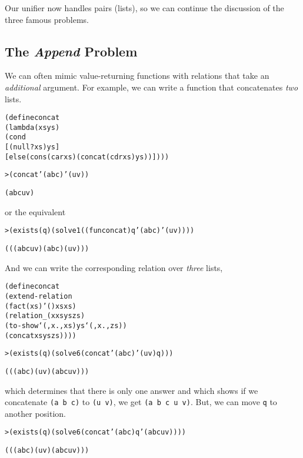 Our unifier now handles pairs (lists), so we can continue the
discussion of the three famous problems.

\subsection{The \emph{Append} Problem}

We can often mimic value-returning functions with relations
that take an \emph{additional} argument.  For example,  we
can write a function that concatenates \emph{two} lists.

\begin{alltt}
(define concat
  (lambda (xs ys)
    (cond
      [(null? xs) ys]
      [else (cons (car xs) (concat (cdr xs) ys))])))
\end{alltt}

\begin{alltt}
> (concat '(a b c) '(u v))

(a b c u v)
\end{alltt}

\noindent
or the equivalent

\begin{alltt}
> (exists (q) (solve 1 ((fun concat) q '(a b c) '(u v))))

(((a b c u v) (a b c) (u v)))
\end{alltt}

\noindent
And we can write the corresponding relation over \emph{three} lists,

\begin{alltt}
(define concat
  (extend-relation
    (fact (xs) '() xs xs)
    (relation _ (x xs ys zs)
      (to-show `(,x . ,xs) ys `(,x . ,zs))
      (concat xs ys zs))))
\end{alltt}        
\noindent

\begin{alltt}
> (exists (q) (solve 6 (concat '(a b c) '(u v) q)))

(((a b c) (u v) (a b c u v)))
\end{alltt}

\noindent which determines that there is only one answer and which
shows if we concatenate \texttt{(a b c)} to \texttt{(u v)}, we get
\texttt{(a b c u v)}. But, we can move \texttt{q} to another position.

\begin{alltt}
> (exists (q) (solve 6 (concat '(a b c) q '(a b c u v))))

(((a b c) (u v) (a b c u v)))
\end{alltt}


